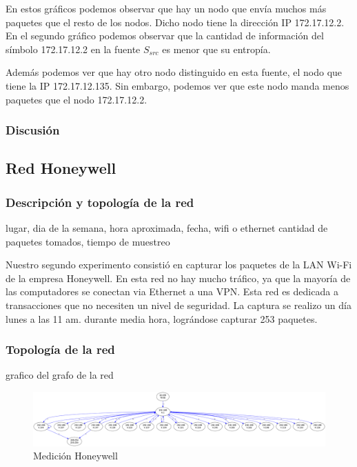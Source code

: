 \documentclass[10pt, a4paper]{article}
\begin{document}
En estos gráficos podemos observar que hay un nodo que envía muchos más paquetes que el resto de los nodos. Dicho nodo tiene la dirección IP 172.17.12.2. En el segundo gráfico podemos observar que la cantidad de información del símbolo 172.17.12.2 en la fuente $S_{src}$ es menor que su entropía.

Además podemos ver que hay otro nodo distinguido en esta fuente, el nodo que tiene la IP 172.17.12.135. Sin embargo, podemos ver que este nodo manda menos paquetes que el nodo 172.17.12.2.
 
\subsubsection{Discusión}



\subsection{Red Honeywell}

\subsubsection{Descripción y topología de la red}


lugar, dia de la semana, hora aproximada, fecha, wifi o ethernet
cantidad de paquetes tomados, tiempo de muestreo

Nuestro segundo experimento consistió en capturar los paquetes de la LAN Wi-Fi de la empresa Honeywell. En esta red no hay mucho tráfico, ya que la mayoría de las computadores se conectan via Ethernet a una VPN. Esta red es dedicada a transacciones que no necesiten un nivel de seguridad. La captura se realizo un día lunes a las 11 am. durante media hora, lográndose capturar 253 paquetes.	

\subsubsection{Topología de la red}

grafico del grafo de la red

\begin{figure}[H]
 \begin{center}
  \includegraphics[width=\linewidth]{../imgs/prueba_laburo-ips_red.png}
  \caption{Medición Honeywell}
 \end{center}
\end{figure}
\end{document}

